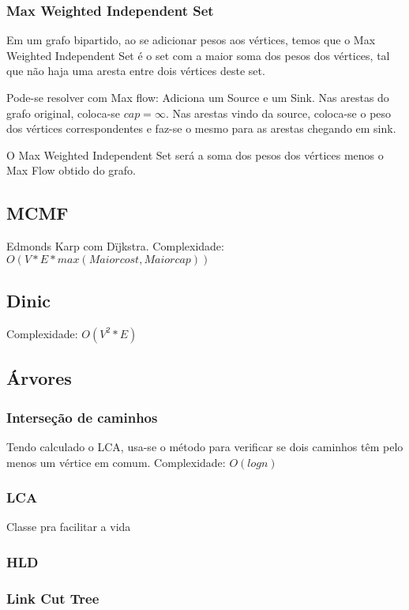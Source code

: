 \subsubsection{Max Weighted Independent Set}
Em um grafo bipartido, ao se adicionar pesos aos v\'{e}rtices, temos que o Max Weighted Independent Set \'{e} o set com a maior soma dos pesos dos v\'{e}rtices, tal que n\~{a}o haja uma aresta entre dois v\'{e}rtices deste set.

Pode-se resolver com Max flow: Adiciona um Source e um Sink. Nas arestas do grafo original, coloca-se $cap=\infty$. Nas arestas vindo da source, coloca-se o peso dos v\'{e}rtices correspondentes e faz-se o mesmo para as arestas chegando em sink.

O Max Weighted Independent Set ser\'{a} a soma dos pesos dos v\'{e}rtices menos o Max Flow obtido do grafo.
\divisor

\subsection{MCMF}
Edmonds Karp com D\"{i}jkstra. Complexidade: $O(V*E*max(Maior cost,Maior cap))$
\divisor

\subsection{Dinic}
Complexidade: $O(V^2*E)$
\divisor

\subsection{\'{A}rvores}
\subsubsection{Interse\c{c}\~{a}o de caminhos}
Tendo calculado o LCA, usa-se o m\'{e}todo para verificar se dois caminhos t\^{e}m pelo menos um v\'{e}rtice em comum. Complexidade: $O(log n)$
\divisor
\subsubsection{LCA}
Classe pra facilitar a vida
\divisor
\subsubsection{HLD}
\divisor
\subsubsection{Link Cut Tree}
\divisor
